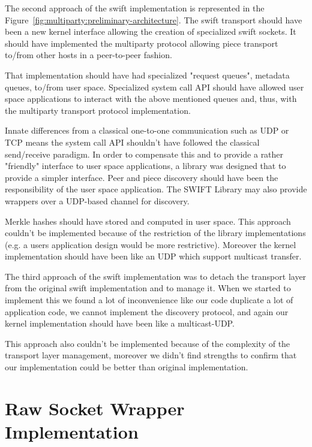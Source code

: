 The second approach of the swift implementation is represented in the
Figure~\ref{fig:multiparty:preliminary-architecture}. The swift transport
should have been a new kernel interface allowing the creation of specialized
swift sockets. It should have implemented the multiparty protocol allowing
piece transport to/from other hosts in a peer-to-peer fashion.

That implementation should have had specialized "request queues", metadata
queues, to/from user space. Specialized system call API should have allowed
user space applications to interact with the above mentioned queues and, thus,
with the multiparty transport protocol implementation.

Innate differences from a classical one-to-one communication such as UDP or
TCP means the system call API shouldn't have followed the classical
send/receive paradigm. In order to compensate this and to provide a rather
"friendly" interface to user space applications, a library was designed that
to provide a simpler interface. Peer and piece discovery should have been the
responsibility of the user space application. The SWIFT Library may also
provide wrappers over a UDP-based channel for discovery.

Merkle hashes should have stored and computed in user space. This approach
couldn't be implemented because of the restriction of the library
implementations (e.g. a users application design would be more restrictive).
Moreover the kernel implementation should have been like an UDP which support
multicast transfer.

The third approach of the swift implementation was to detach the transport
layer from the original swift implementation and to manage it. When we started
to implement this we found a lot of inconvenience like our code duplicate a
lot of application code, we cannot implement the discovery protocol, and again
our kernel implementation should have been like a multicast-UDP.

This approach also couldn't be implemented because of the complexity of the
transport layer management, moreover we didn't find strengths to confirm that
our implementation could be better than original implementation.

\section{Raw Socket Wrapper Implementation}
\label{sec:multiparty:raw-socket}


